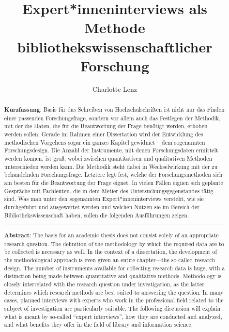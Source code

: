 \documentclass[a4paper,
fontsize=11pt,
oneside,
numbers=noperiodatend,
parskip=half-,
bibliography=totoc,
final
]{scrartcl}
\title{\LARGE{Expert*inneninterviews als Methode bibliothekswissenschaftlicher Forschung}}%
\author{Charlotte Lenz} %
\date{}
\begin{document}
\maketitle
\thispagestyle{fancyplain} 

\begin{abstract}
\noindent
\textbf{Kurzfassung}: Basis für das Schreiben von Hochschulschriften ist
nicht nur das Finden einer passenden Forschungsfrage, sondern vor allem
auch das Festlegen der Methodik, mit der die Daten, die für die
Beantwortung der Frage benötigt werden, erhoben werden sollen. Gerade im
Rahmen einer Dissertation wird der Entwicklung des methodischen
Vorgehens sogar ein ganzes Kapitel gewidmet -- dem sogenannten
Forschungsdesign. Die Anzahl der Instrumente, mit denen Forschungsdaten
ermittelt werden können, ist groß, wobei zwischen quantitativen und
qualitativen Methoden unterschieden werden kann. Die Methodik steht
dabei in Wechselwirkung mit der zu behandelnden Forschungsfrage.
Letztere legt fest, welche der Forschungsmethoden sich am besten für die
Beantwortung der Frage eignet. In vielen Fällen eignen sich geplante
Gespräche mit Fachleuten, die in dem Metier des
Untersuchungsgegenstandes tätig sind. Was man unter den sogenannten
Expert*inneninterviews versteht, wie sie durchgeführt und ausgewertet
werden und welchen Nutzen sie im Bereich der Bibliothekswissenschaft
haben, sollen die folgenden Ausführungen zeigen.

\begin{center}\rule{0.5\linewidth}{0.5pt}\end{center}

\noindent\textbf{Abstract}: The basis for an academic thesis does not consist
solely of an appropriate research question. The definition of the
methodology by which the required data are to be collected is necessary
as well. In the context of a dissertation, the development of the
methodological approach is even given an entire chapter---the so-called
research design. The number of instruments available for collecting
research data is huge, with a distinction being made between
quantitative and qualitative methods. Methodology is closely
interrelated with the research question under investigation, as the
latter determines which research methods are best suited to answering
the question. In many cases, planned interviews with experts who work in
the professional field related to the subject of investigation are
particularly suitable. The following discussion will explain what is
meant by so-called \enquote{expert interviews}, how they are conducted and
analyzed, and what benefits they offer in the field of library and
information science.
\end{abstract}
\end{document}
